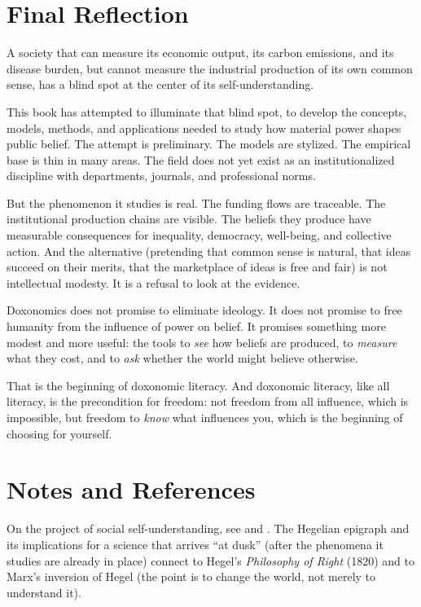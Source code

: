 \section{Final Reflection}
\label{sec:ch35-final}

A society that can measure its economic output, its carbon emissions, and its disease burden, but cannot measure the industrial production of its own common sense, has a blind spot at the center of its self-understanding.

This book has attempted to illuminate that blind spot, to develop the concepts, models, methods, and applications needed to study how material power shapes public belief.
The attempt is preliminary.
The models are stylized.
The empirical base is thin in many areas.
The field does not yet exist as an institutionalized discipline with departments, journals, and professional norms.

But the phenomenon it studies is real.
The funding flows are traceable.
The institutional production chains are visible.
The beliefs they produce have measurable consequences for inequality, democracy, well-being, and collective action.
And the alternative (pretending that common sense is natural, that ideas succeed on their merits, that the marketplace of ideas is free and fair) is not intellectual modesty.
It is a refusal to look at the evidence.

Doxonomics does not promise to eliminate ideology.
It does not promise to free humanity from the influence of power on belief.
It promises something more modest and more useful: the tools to \emph{see} how beliefs are produced, to \emph{measure} what they cost, and to \emph{ask} whether the world might believe otherwise.

That is the beginning of doxonomic literacy.
And doxonomic literacy, like all literacy, is the precondition for freedom: not freedom from all influence, which is impossible, but freedom to \emph{know} what influences you, which is the beginning of choosing for yourself.

\section{Notes and References}
\label{sec:ch35-notes}

On the project of social self-understanding, see \textcite{dewey1927} and \textcite{habermas1962}.
The Hegelian epigraph and its implications for a science that arrives ``at dusk'' (after the phenomena it studies are already in place) connect to Hegel's \emph{Philosophy of Right} (1820) and to Marx's inversion of Hegel (the point is to change the world, not merely to understand it).

